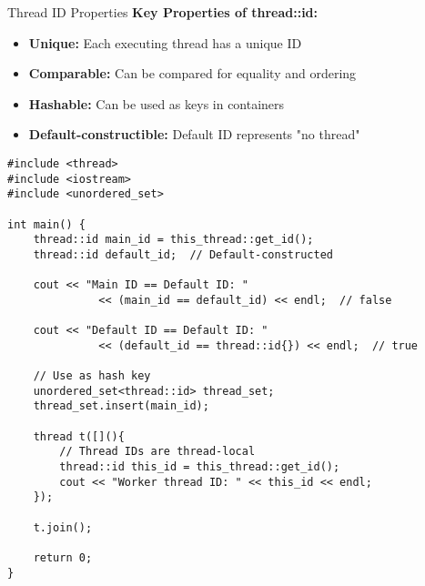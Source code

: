 \begin{frame}[fragile]{Thread ID Properties}
	\textbf{Key Properties of thread::id:}

	\begin{itemize}
		\item \textbf{Unique:} Each executing thread has a unique ID
		\item \textbf{Comparable:} Can be compared for equality and ordering
		\item \textbf{Hashable:} Can be used as keys in containers
		\item \textbf{Default-constructible:} Default ID represents "no thread"
	\end{itemize}

	\begin{verbatim}
#include <thread>
#include <iostream>
#include <unordered_set>

int main() {
    thread::id main_id = this_thread::get_id();
    thread::id default_id;  // Default-constructed

    cout << "Main ID == Default ID: "
              << (main_id == default_id) << endl;  // false

    cout << "Default ID == Default ID: "
              << (default_id == thread::id{}) << endl;  // true

    // Use as hash key
    unordered_set<thread::id> thread_set;
    thread_set.insert(main_id);

    thread t([](){
        // Thread IDs are thread-local
        thread::id this_id = this_thread::get_id();
        cout << "Worker thread ID: " << this_id << endl;
    });

    t.join();

    return 0;
}
	\end{verbatim}
\end{frame}

